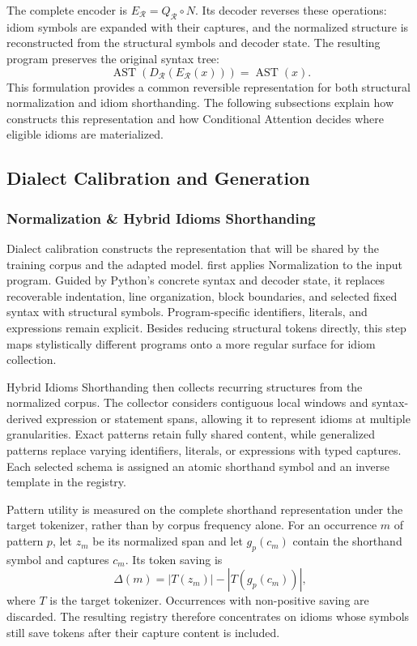 The complete encoder is $E_{\mathcal{R}}=Q_{\mathcal{R}}\circ N$. Its decoder reverses these operations: idiom symbols are expanded with their captures, and the normalized structure is reconstructed from the structural symbols and decoder state. The resulting program preserves the original syntax tree:
\begin{equation}
    \operatorname{AST}\!\left(D_{\mathcal{R}}(E_{\mathcal{R}}(x))\right)
    = \operatorname{AST}(x).
\end{equation}
This formulation provides a common reversible representation for both structural normalization and idiom shorthanding. The following subsections explain how \tool constructs this representation and how Conditional Attention decides where eligible idioms are materialized.

\subsection{Dialect Calibration and Generation}

\subsubsection{Normalization \& Hybrid Idioms Shorthanding}
\label{subsec:codec}

Dialect calibration constructs the representation that will be shared by the training corpus and the adapted model. \tool first applies Normalization to the input program. Guided by Python's concrete syntax and decoder state, it replaces recoverable indentation, line organization, block boundaries, and selected fixed syntax with structural symbols. Program-specific identifiers, literals, and expressions remain explicit. Besides reducing structural tokens directly, this step maps stylistically different programs onto a more regular surface for idiom collection.

Hybrid Idioms Shorthanding then collects recurring structures from the normalized corpus. The collector considers contiguous local windows and syntax-derived expression or statement spans, allowing it to represent idioms at multiple granularities. Exact patterns retain fully shared content, while generalized patterns replace varying identifiers, literals, or expressions with typed captures. Each selected schema is assigned an atomic shorthand symbol and an inverse template in the registry.

Pattern utility is measured on the complete shorthand representation under the target tokenizer, rather than by corpus frequency alone. For an occurrence $m$ of pattern $p$, let $z_m$ be its normalized span and let $g_p(c_m)$ contain the shorthand symbol and captures $c_m$. Its token saving is
\begin{equation}
    \Delta(m)=|T(z_m)|-|T(g_p(c_m))|,
\end{equation}
where $T$ is the target tokenizer. Occurrences with non-positive saving are discarded. The resulting registry therefore concentrates on idioms whose symbols still save tokens after their capture content is included.

